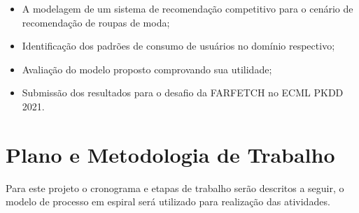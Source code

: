 \documentclass{article}
\begin{document}
\begin{itemize}
   \item A modelagem de um sistema de recomendação competitivo para o cenário de recomendação de roupas de moda;
   \item Identificação dos padrões de consumo de usuários no domínio respectivo;
   \item Avaliação do modelo proposto comprovando sua utilidade;
   \item Submissão dos resultados para o desafio da FARFETCH no ECML PKDD 2021.
\end{itemize}

\section{Plano e Metodologia de Trabalho}

Para este projeto o cronograma e etapas de trabalho serão descritos a seguir, o modelo de processo em espiral será utilizado para realização das atividades.
\end{document}
